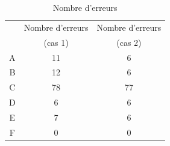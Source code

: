 \documentclass{scrartcl}
\begin{document}
    \begin{table}[h]
        \centering
        \caption{Nombre d'erreurs}
        \begin{tabular}{ccc}
            \toprule
            {} & {Nombre d'erreurs} & {Nombre d'erreurs} \\
            {} & {(cas 1)} & {(cas 2)}\\
            \midrule
            A & 11 & 6\\
            B & 12 & 6\\
            C & 78 & 77\\
            D & 6 & 6\\
            E & 7 & 6\\
            F & 0 & 0\\
            \bottomrule            
        \end{tabular}
    \end{table}
\end{document}
